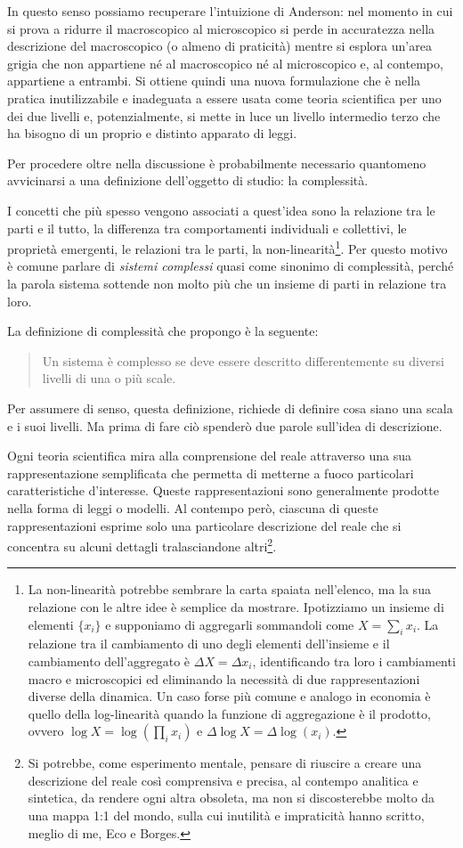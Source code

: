 \documentclass[a4paper, headings=standardclasses]{scrartcl}
\begin{document}
In questo senso possiamo recuperare l'intuizione di Anderson: nel momento in cui si prova a ridurre il macroscopico al microscopico si perde in accuratezza nella descrizione del macroscopico (o almeno di praticità) mentre si esplora un'area grigia che non appartiene né al macroscopico né al microscopico e, al contempo, appartiene a entrambi.
Si ottiene quindi una nuova formulazione che è nella pratica inutilizzabile e inadeguata a essere usata come teoria scientifica per uno dei due livelli e, potenzialmente, si mette in luce un livello intermedio terzo che ha bisogno di un proprio e distinto apparato di leggi.

Per procedere oltre nella discussione è probabilmente necessario quantomeno avvicinarsi a una definizione dell'oggetto di studio: la complessità.

I concetti che più spesso vengono associati a quest'idea sono la relazione tra le parti e il tutto, la differenza tra comportamenti individuali e collettivi, le proprietà emergenti, le relazioni tra le parti, la non-linearità\footnote{La non-linearità potrebbe sembrare la carta spaiata nell'elenco, ma la sua relazione con le altre idee è semplice da mostrare. Ipotizziamo un insieme di elementi $\{x_i\}$ e supponiamo di aggregarli sommandoli come $X=\sum_i x_i$. La relazione tra il cambiamento di uno degli elementi dell'insieme e il cambiamento dell'aggregato è $\Delta X=\Delta x_i$, identificando tra loro i cambiamenti macro e microscopici ed eliminando la necessità di due rappresentazioni diverse della dinamica. Un caso forse più comune e analogo in economia è quello della log-linearità quando la funzione di aggregazione è il prodotto, ovvero $\log X = \log(\prod_i x_i)$ e $\Delta \log X=\Delta\log(x_i)$.}. Per questo motivo è comune parlare di \textit{sistemi complessi} quasi come sinonimo di complessità, perché la parola sistema sottende non molto più che un insieme di parti in relazione tra loro.

La definizione di complessità che propongo è la seguente:
\begin{quote}
	Un sistema è complesso se deve essere descritto differentemente su diversi livelli di una o più scale.
\end{quote}

Per assumere di senso, questa definizione, richiede di definire cosa siano una scala e i suoi livelli. Ma prima di fare ciò spenderò due parole sull'idea di descrizione.

Ogni teoria scientifica mira alla comprensione del reale attraverso una sua rappresentazione semplificata che permetta di metterne a fuoco particolari caratteristiche d'interesse. Queste rappresentazioni sono generalmente prodotte nella forma di leggi o modelli.
Al contempo però, ciascuna di queste rappresentazioni esprime solo una particolare descrizione del reale che si concentra su alcuni dettagli tralasciandone altri\footnote{Si potrebbe, come esperimento mentale, pensare di riuscire a creare una descrizione del reale così comprensiva e precisa, al contempo analitica e sintetica, da rendere ogni altra obsoleta, ma non si discosterebbe molto da una mappa 1:1 del mondo, sulla cui inutilità e impraticità hanno scritto, meglio di me, Eco e Borges.}.
\end{document}
